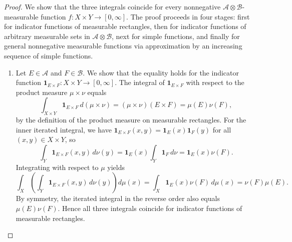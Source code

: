 \begin{proof}
We show that the three integrals coincide for every nonnegative $\mathcal{A} \otimes \mathcal{B}$-measurable function $f : X \times Y \to [0,\infty]$. The proof proceeds in four stages: first for indicator functions of measurable rectangles, then for indicator functions of arbitrary measurable sets in $\mathcal{A} \otimes \mathcal{B}$, next for simple functions, and finally for general nonnegative measurable functions via approximation by an increasing sequence of simple functions.

\begin{enumerate}
    \item Let $E \in \mathcal{A}$ and $F \in \mathcal{B}$. We show that the equality holds for the indicator function $\mathbf{1}_{E \times F} : X \times Y \to [0,\infty]$. The integral of $\mathbf{1}_{E \times F}$ with respect to the product measure $\mu \times \nu$ equals
    $$\int_{X \times Y} \mathbf{1}_{E \times F}\,d(\mu \times \nu) = (\mu \times \nu)(E \times F) = \mu(E)\nu(F),$$
    by the definition of the product measure on measurable rectangles. For the inner iterated integral, we have $\mathbf{1}_{E \times F}(x,y) = \mathbf{1}_E(x)\mathbf{1}_F(y)$ for all $(x,y) \in X \times Y$, so
    $$\int_Y \mathbf{1}_{E \times F}(x,y)\,d\nu(y) = \mathbf{1}_E(x) \int_Y \mathbf{1}_F\,d\nu = \mathbf{1}_E(x)\nu(F).$$
    Integrating with respect to $\mu$ yields
    $$\int_X \left(\int_Y \mathbf{1}_{E \times F}(x,y)\,d\nu(y)\right) d\mu(x) = \int_X \mathbf{1}_E(x)\nu(F)\,d\mu(x) = \nu(F)\mu(E).$$
    By symmetry, the iterated integral in the reverse order also equals $\mu(E)\nu(F)$. Hence all three integrals coincide for indicator functions of measurable rectangles.


\end{enumerate}
\end{proof}
